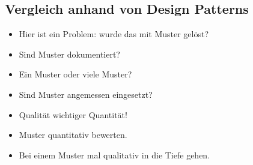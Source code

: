 \subsection{Vergleich anhand von Design Patterns}
\begin{itemize}
    \item Hier ist ein Problem: wurde das mit Muster gelöst?
    \item Sind Muster dokumentiert?
    \item Ein Muster oder viele Muster?
    \item Sind Muster angemessen eingesetzt?
    \item Qualität wichtiger Quantität!
    \item Muster quantitativ bewerten.
    \item Bei einem Muster mal qualitativ in die Tiefe gehen.
\end{itemize}
